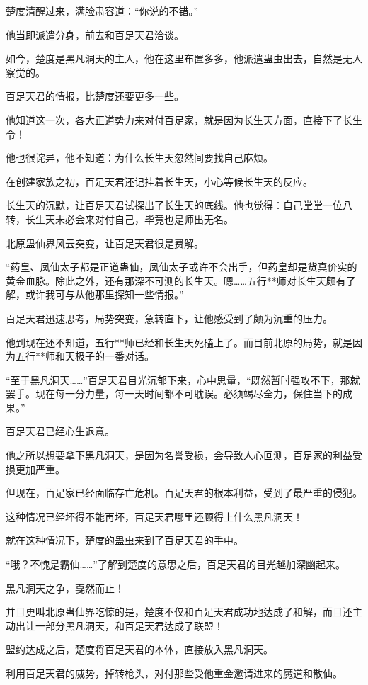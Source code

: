 \begin{this_body}
楚度清醒过来，满脸肃容道：“你说的不错。”

他当即派遣分身，前去和百足天君洽谈。

如今，楚度是黑凡洞天的主人，他在这里布置多多，他派遣蛊虫出去，自然是无人察觉的。

百足天君的情报，比楚度还要更多一些。

他知道这一次，各大正道势力来对付百足家，就是因为长生天方面，直接下了长生令！

他也很诧异，他不知道：为什么长生天忽然间要找自己麻烦。

在创建家族之初，百足天君还记挂着长生天，小心等候长生天的反应。

长生天的沉默，让百足天君试探出了长生天的底线。他也觉得：自己堂堂一位八转，长生天未必会来对付自己，毕竟也是师出无名。

北原蛊仙界风云突变，让百足天君很是费解。

“药皇、凤仙太子都是正道蛊仙，凤仙太子或许不会出手，但药皇却是货真价实的黄金血脉。除此之外，还有那深不可测的长生天。嗯……五行**师对长生天颇有了解，或许我可与从他那里探知一些情报。”

百足天君迅速思考，局势突变，急转直下，让他感受到了颇为沉重的压力。

他到现在还不知道，五行**师已经和长生天死磕上了。而目前北原的局势，就是因为五行**师和天极子的一番对话。

“至于黑凡洞天……”百足天君目光沉郁下来，心中思量，“既然暂时强攻不下，那就罢手。现在每一分力量，每一天时间都不可耽误。必须竭尽全力，保住当下的成果。”

百足天君已经心生退意。

他之所以想要拿下黑凡洞天，是因为名誉受损，会导致人心叵测，百足家的利益受损更加严重。

但现在，百足家已经面临存亡危机。百足天君的根本利益，受到了最严重的侵犯。

这种情况已经坏得不能再坏，百足天君哪里还顾得上什么黑凡洞天！

就在这种情况下，楚度的蛊虫来到了百足天君的手中。

“哦？不愧是霸仙……”了解到楚度的意思之后，百足天君的目光越加深幽起来。

黑凡洞天之争，戛然而止！

并且更叫北原蛊仙界吃惊的是，楚度不仅和百足天君成功地达成了和解，而且还主动出让一部分黑凡洞天，和百足天君达成了联盟！

盟约达成之后，楚度将百足天君的本体，直接放入黑凡洞天。

利用百足天君的威势，掉转枪头，对付那些受他重金邀请进来的魔道和散仙。


\end{this_body}
